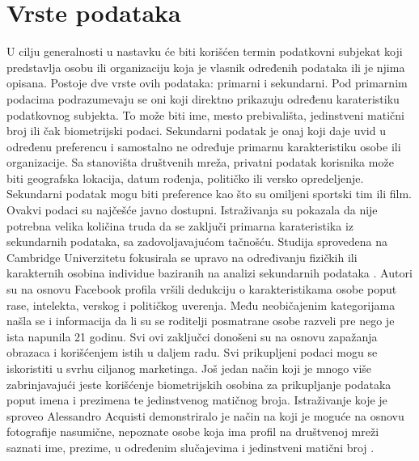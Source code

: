 \documentclass[a4paper]{article}
\begin{document}
\section{Vrste podataka}
\large
U cilju generalnosti u nastavku će biti korišćen termin podatkovni subjekat koji predstavlja osobu ili organizaciju koja je vlasnik određenih podataka ili je njima opisana. Postoje dve vrste ovih podataka: primarni i sekundarni. Pod primarnim podacima podrazumevaju se oni koji direktno prikazuju određenu karateristiku podatkovnog subjekta. To može biti ime, mesto prebivališta, jedinstveni matični broj ili
čak biometrijski podaci. Sekundarni podatak je onaj koji daje uvid u određenu preferencu i samostalno ne određuje primarnu karakteristiku osobe ili organizacije. Sa stanovišta društvenih mreža, privatni podatak korisnika može biti geografska lokacija, datum rođenja, političko ili versko opredeljenje. Sekundarni podatak mogu biti preference kao što su omiljeni sportski tim ili film. Ovakvi podaci su najčešće javno dostupni. Istraživanja su pokazala da nije potrebna velika količina truda da se zaključi primarna karateristika iz sekundarnih podataka, sa zadovoljavajućom tačnošću. Studija sprovedena na Cambridge Univerzitetu fokusirala se upravo na određivanju fizičkih ili karakternih osobina individue baziranih na analizi sekundarnih podataka \cite{Kosinskia}. Autori su na osnovu Facebook profila vršili dedukciju o karakteristikama osobe poput rase, intelekta, verskog i političkog uverenja. Među neobičajenim
kategorijama našla se i informacija da li su se roditelji posmatrane osobe razveli pre nego je ista napunila 21 godinu. Svi ovi zaključci donošeni su na osnovu zapažanja obrazaca i korišćenjem istih u daljem radu. Svi prikupljeni podaci mogu se iskoristiti u svrhu ciljanog marketinga. Još jedan način koji je mnogo više zabrinjavajući jeste korišćenje biometrijskih osobina za prikupljanje podataka poput
imena i prezimena te jedinstvenog matičnog broja. Istraživanje koje je sproveo Alessandro Acquisti demonstriralo je način na koji je moguće na osnovu fotografije nasumične, nepoznate
osobe koja ima profil na društvenoj mreži saznati ime, prezime, u određenim slučajevima i jedinstveni matični broj \cite{Acquisti}.
\newpage
\end{document}
